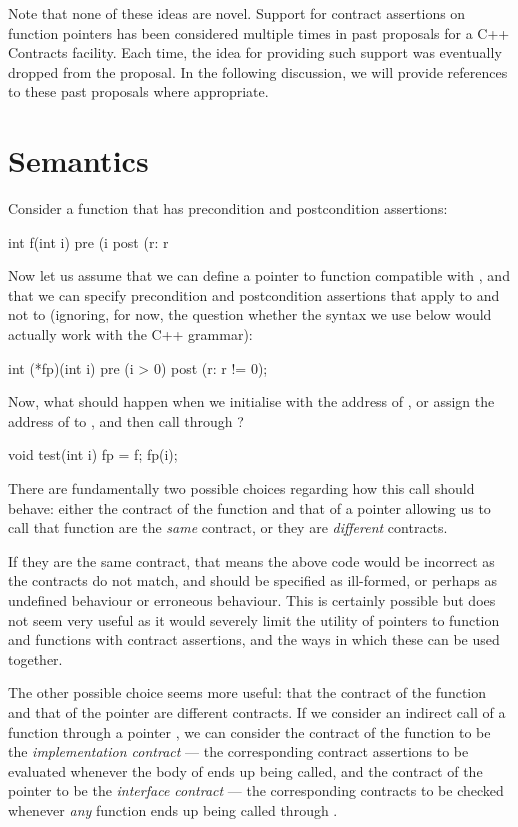 Note that none of these ideas are novel. Support for contract assertions on function pointers has been considered multiple times in past proposals for a C++ Contracts facility. Each time, the idea for providing such support was eventually dropped from the proposal. In the following discussion, we will provide references to these past proposals where appropriate.

\section{Semantics}
Consider a function that has precondition and postcondition assertions:
\begin{codeblock}
int f(int i)
  pre (i %
  post (r: r %
\end{codeblock}
Now let us assume that we can define a pointer to function  compatible with , and that we can specify precondition and postcondition assertions that apply to  and not to  (ignoring, for now, the question whether the syntax we use below would actually work with the C++ grammar):
\begin{codeblock}
int (*fp)(int i) 
  pre (i > 0) 
  post (r: r != 0);
\end{codeblock}
Now, what should happen when we initialise  with the address of , or assign the address of  to , and then call  through ?
\begin{codeblock}  
void test(int i) {
  fp = f;    
  fp(i);
}
\end{codeblock}
There are fundamentally two possible choices regarding how this call should behave: either the contract of the function and that of a pointer allowing us to call that function are the \emph{same} contract, or they are \emph{different} contracts.

If they are the same contract, that means the above code would be incorrect as the contracts do not match, and should be specified as ill-formed, or perhaps as undefined behaviour or erroneous behaviour. This is certainly possible but does not seem very useful as it would severely limit the utility of pointers to function and functions with contract assertions, and the ways in which these can be used together.

The other possible choice seems more useful: that the contract of the function and that of the pointer are different contracts. If we consider an indirect call of a function  through a pointer , we can consider the contract of the function  to be the \emph{implementation contract} --- the corresponding contract assertions to be evaluated whenever the body of  ends up being called, and the contract of the pointer  to be the \emph{interface contract} --- the corresponding contracts to be checked whenever \emph{any} function ends up being called through .


